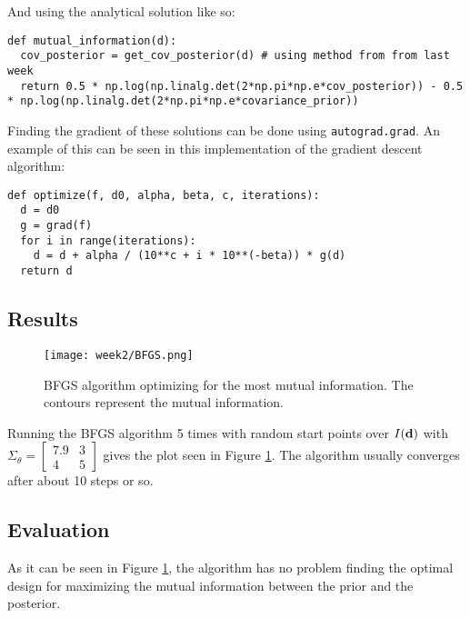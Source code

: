 And using the analytical solution like so:
\begin{verbatim}
def mutual_information(d):
  cov_posterior = get_cov_posterior(d) # using method from from last week
  return 0.5 * np.log(np.linalg.det(2*np.pi*np.e*cov_posterior)) - 0.5 * np.log(np.linalg.det(2*np.pi*np.e*covariance_prior))
\end{verbatim}

Finding the gradient of these solutions can be done using \texttt{autograd.grad}. 
An example of this can be seen in this implementation of the gradient descent algorithm:
\begin{verbatim}
def optimize(f, d0, alpha, beta, c, iterations):
  d = d0
  g = grad(f)
  for i in range(iterations):
    d = d + alpha / (10**c + i * 10**(-beta)) * g(d)
  return d
\end{verbatim}
\subsection{Results}
\begin{figure}
  \centering
  \texttt{[image: week2/BFGS.png]}
  \caption{BFGS algorithm optimizing for the most mutual information. The contours represent the mutual information.}
  \label{fig:BFGS}
\end{figure}
Running the BFGS algorithm 5 times with random start points over $I(\mathbf{d})$ with $\Sigma_\theta=\begin{bmatrix}7.9 & 3 \\ 4 & 5\end{bmatrix}$ gives the plot seen in Figure \ref{fig:BFGS}. The algorithm usually converges after about 10 steps or so.
\subsection{Evaluation}
As it can be seen in Figure \ref{fig:BFGS}, the algorithm has no problem finding the optimal design for maximizing the mutual information between the prior and the posterior.

